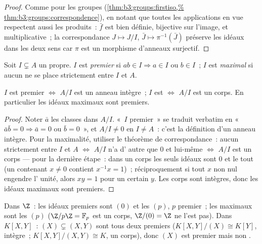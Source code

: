 \begin{proof}
Comme pour les groupes (\cref{thm:b3:groups:firstiso,%
thm:b3:groups:correspondence}), en notant que toutes les
applications en vue respectent aussi les produits~: $\bar f$ est
bien définie, bijective sur l'image, et multiplicative~; la
correspondance $J \mapsto J/I$, $\bar J \mapsto \pi^{-1}(\bar
J)$ préserve les idéaux dans les deux sens car $\pi$ est un
morphisme d'anneaux surjectif.
\end{proof}

\begin{definition}\label{def:b3:rings:primemaximal}
Soit $I \subsetneq A$ un  propre. $I$ est
\emph{premier} si $ab \in I \Rightarrow a
\in I$ ou $b \in I$~; $I$ est \emph{maximal}
si aucun  ne se place strictement entre $I$ et $A$.
\end{definition}

\begin{proposition}\label{prop:b3:rings:primemaximal}
$I$ est premier $\iff$ $A/I$ est un anneau intègre~; $I$ est
 $\iff$ $A/I$ est un corps. En particulier les idéaux
maximaux sont premiers.
\end{proposition}

\begin{proof}
Noter $\bar a$ les classes dans $A/I$. «~$I$ premier~» se
traduit verbatim en «~$\bar a\bar b = 0 \Rightarrow \bar a = 0$
ou $\bar b = 0$~», et $A/I \neq 0$ en $I \neq A$~: c'est la
définition d'un anneau intègre. Pour la maximalité, utiliser le
théorème de correspondance~: aucun  strictement entre $I$
et $A$ $\iff$ $A/I$ n'a d' autre que $0$ et lui-même $\iff$
$A/I$ est un corps --- pour la dernière étape~: dans un corps
les seuls idéaux sont $0$ et le tout (un  contenant $x \ne
0$ contient $x^{-1}x = 1$)~; réciproquement si tout $x$ non nul
engendre l' unité, alors $xy = 1$ pour un certain $y$. Les
corps sont intègres, donc les idéaux maximaux sont premiers.
\end{proof}

\begin{example}\label{ex:b3:rings:primemaximal}
Dans $\Z$~: les idéaux premiers sont $(0)$ et les $(p)$, $p$
premier~; les maximaux sont les $(p)$ ($\Z/p\Z = \mathbb F_p$
est un corps, $\Z/(0) = \Z$ ne l'est pas). Dans $K[X, Y]$~: $(X)
\subsetneq (X, Y)$ sont tous deux premiers ($K[X,Y]/(X) \cong
K[Y]$, intègre~; $K[X,Y]/(X,Y) \cong K$, un corps), donc $(X)$
est premier mais non .
\end{example}

